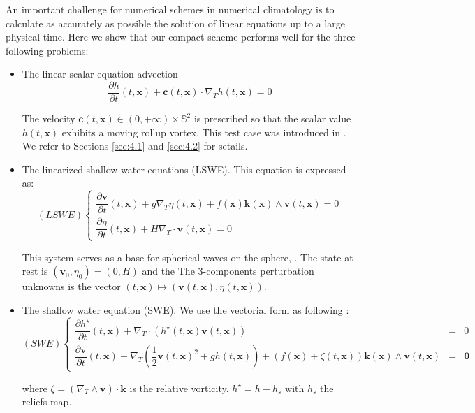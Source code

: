 An important challenge for numerical schemes in numerical climatology 
is to calculate as accurately as possible 
the solution of linear equations up to a large physical time.
Here we show that our compact scheme performs well
for the three following problems:
\begin{itemize}
\item 
The linear scalar equation
advection 
\begin{equation}
\label{eq:adv}
\dfrac{\partial h}{\partial t}  (t,\mathbf{x})+ \mathbf{c}(t,\mathbf{x}) \cdot \nabla_T h(t,\mathbf{x})=0
\end{equation}

The velocity $\mathbf{c}(t,\mathbf{x}) \in (0, +\infty) \times \mathbb{S}^2$ is prescribed
so that the scalar value $h(t,\mathbf{x})$ exhibits a moving rollup vortex.
This test case was introduced
in \cite{Nair-Machenhauer,Nair-Jablonowski}. We refer to Sections
\ref{sec:4.1} and \ref{sec:4.2} for setails.
\item
The linearized shallow water equations (LSWE). This equation
is expressed as:
\begin{equation}
\label{eq:lswe}
(LSWE) \left\{
\begin{array}{l}
\dfrac{\partial \mathbf{v} }{\partial t} (t,\mathbf{x})+ g \nabla_T \eta(t,\mathbf{x}) + f(\mathbf{x}) \mathbf{k}(\mathbf{x}) \wedge
\mathbf{v}(t,\mathbf{x})=0\\
\dfrac{\partial \eta}{\partial t} (t,\mathbf{x})+ H \nabla_T \cdot \mathbf{v}(t,\mathbf{x})=0
\end{array}
\right.
\end{equation}


This system serves as a base for spherical waves on the sphere,
\cite{Paldor}. The state at rest is 
$(\mathbf{v}_0,\eta_0)=(0,H)$ and the 
The 3-components perturbation unknowns is
the vector $(t,\mathbf{x}) \mapsto (\mathbf{v}(t,\mathbf{x}), \eta(t,\mathbf{x}))$.
\item The shallow water equation (SWE). We use the vectorial form as following :
\begin{equation}
\label{eq:swe}
(SWE) \left\lbrace
\begin{array}{rcl}
\dfrac{\partial h^{\star}}{\partial t} (t,\mathbf{x}) + \nabla_T \cdot \left( h^{\star}(t,\mathbf{x}) \mathbf{v}(t,\mathbf{x}) \right) & = & 0 \\
\dfrac{\partial \mathbf{v}}{\partial t}  (t,\mathbf{x}) + \nabla_T \left( \dfrac{1}{2} \mathbf{v}(t,\mathbf{x})^2 + g h(t,\mathbf{x}) \right) + \left( f(\mathbf{x}) + \zeta(t,\mathbf{x}) \right) \mathbf{k}(\mathbf{x}) \wedge \mathbf{v}(t,\mathbf{x}) & = & \mathbf{0} 
\end{array}
\right.
\end{equation}

where $\zeta = \left( \nabla_T \wedge \mathbf{v} \right) \cdot \mathbf{k}$ is the relative vorticity. $h^{\star} = h - h_s$ with $h_s$ the reliefs map.
\end{itemize}

